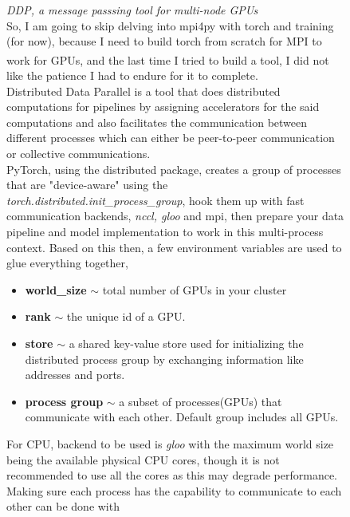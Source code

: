 \documentclass[12pt]{article}
\newcommand{\customtext}[3]{%
    \vspace{#2} %
    \fontsize{13}{8}\textcolor{#1}{\textit{#3}}%
}
\newcommand{\sidecite}[1]{\textsuperscript{\textcolor{blue}{\textbf{\scriptsize#1}}}}
\newcommand{\maincitecount}{\sidecite{\stepcounter{maincite}\themaincite}}
\begin{document}
\begin{figure}[!htb]
    \begin{minipage}[t]{0.65\textwidth}
    \customtext{xtitle}{0em}{DDP, a message passsing tool for multi-node GPUs}\\
    So, I am going to skip delving into mpi4py with torch and training (for now),
    because I need to build torch from scratch for MPI to work for GPUs, and the 
    last time I tried to build a tool\maincitecount, I did not like the patience I 
    had to endure for it to complete.\\
    Distributed Data Parallel is a tool that does distributed computations for 
    pipelines by assigning accelerators for the said computations and also 
    facilitates the communication between different processes which can either be 
    peer-to-peer communication or collective communications.\\
    PyTorch, using the distributed package, creates a group of processes that are 
    "device-aware" using the {\it \color{xlink} torch.distributed.init\_process\_group},
    hook them up with fast communication backends, {\it nccl, gloo} and {mpi}, 
    then prepare your data pipeline and model implementation to work in this 
    multi-process context. Based on this then,  a few environment variables are used to glue everything 
    together,
    \begin{itemize}[left=0pt,topsep=0pt,itemsep=0ex,parsep=0ex]
    \item \textbf{world\_size} {\small $\sim$} total number of GPUs in your cluster 
    \item \textbf{rank} {\small $\sim$} the unique id of a GPU.
    \item \textbf{store} {\small $\sim$} a shared key-value store used for initializing 
    the distributed process group by exchanging information like addresses 
    and ports.
    \item \textbf{process group} {\small $\sim$} a subset of processes(GPUs) that 
    communicate with each other. Default group includes all GPUs.
    \end{itemize}
    For CPU, backend to be used is {\it gloo} with the maximum world size being the 
    available physical CPU cores, though it is not recommended to use all the cores as 
    this may degrade performance. Making sure each process has the capability to 
    communicate to each other can be done with 
\begin{lstlisting}[language=python,style=python,basicstyle=\ttfamily\footnotesize]

\end{lstlisting}
\end{minipage}
\end{figure}
\end{document}

